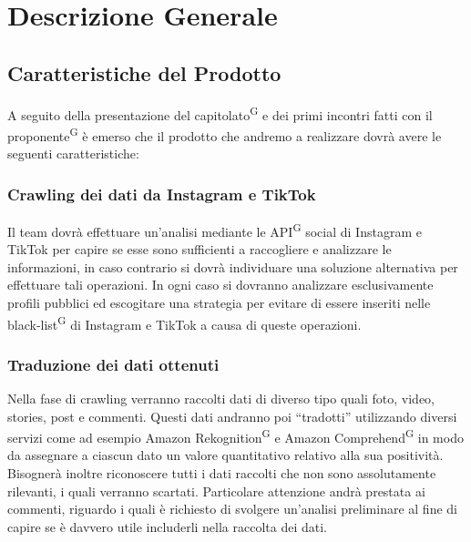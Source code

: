 \section{Descrizione Generale}

\subsection{Caratteristiche del Prodotto}

A seguito della presentazione del capitolato\textsuperscript{G} e dei primi incontri fatti con il proponente\textsuperscript{G} è emerso che il prodotto che andremo a realizzare dovrà avere le seguenti caratteristiche:

\subsubsection{Crawling dei dati da Instagram e TikTok}
Il team dovrà effettuare un’analisi mediante le API\textsuperscript{G} social di Instagram e TikTok per capire se esse sono sufficienti a raccogliere e analizzare le informazioni, in caso contrario si dovrà individuare una soluzione alternativa per effettuare tali operazioni. In ogni caso si dovranno analizzare esclusivamente profili pubblici ed escogitare una strategia per evitare di essere inseriti nelle black-list\textsuperscript{G} di Instagram e TikTok a causa di queste operazioni.

\subsubsection{Traduzione dei dati ottenuti}
Nella fase di crawling verranno raccolti dati di diverso tipo quali foto, video, stories, post e commenti. Questi dati andranno poi “tradotti” utilizzando diversi servizi come ad esempio Amazon Rekognition\textsuperscript{G} e Amazon Comprehend\textsuperscript{G} in modo da assegnare a ciascun dato un valore quantitativo relativo alla sua positività. Bisognerà inoltre riconoscere tutti i dati raccolti che non sono assolutamente rilevanti, i quali verranno scartati. Particolare attenzione andrà prestata ai commenti, riguardo i quali è richiesto di svolgere un’analisi preliminare al fine di capire se è davvero utile includerli nella raccolta dei dati.

